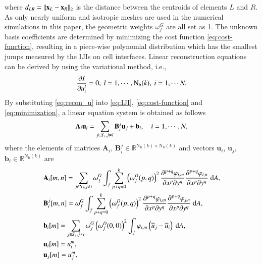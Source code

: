 where $d_{LR}= \left\| \mathbf{x}_L -\mathbf{x}_R \right\|_2$ is the distance between the centroids of elements $L$ and $R$.
As only nearly uniform and isotropic meshes are used in the numerical simulations in this paper,
the geometric weights
$\omega^G_f$ are all set as 1.
The unknown basis coefficients are determined by minimizing the cost function \eqref{eq:cost-function}, resulting in a  piece-wise polynomial distribution which has the smallest jumps measured by the IJIs on cell interfaces.
Linear reconstruction equations can be derived by using the variational method, i.e.,
\begin{equation}
    \label{eq:minimization}
    \partialderivative{I}{u_i^l} = 0, \ l=1,\cdots, \mathrm{N_b}(k),\  i=1,\cdots N.
\end{equation}
By substituting \eqref{eq:recon_u} into \eqref{eq:IJI}, \eqref{eq:cost-function} and \eqref{eq:minimization}, a linear equation system is obtained as follows
\begin{equation}
    \label{eq:vrBlockEq}
    \mathbf{A}_{i} \mathbf{u}_i
    =
    \sum_{j \in S_i, j \neq i} \mathbf{B}^j_{i} \mathbf{u}_j + \mathbf{b}_{i}, \quad i=1, \cdots, N,
\end{equation}
where the elements of matrices
$\mathbf{A}_i$, $\mathbf{B}^j_i \in \mathbb{R}^{\mathrm{N_b}(k) \times \mathrm{N_b}(k)}$
and vectors $\mathbf{u}_i$, $\mathbf{u}_j$, $\mathbf{b}_i \in \mathbb{R}^{\mathrm{N_b}(k)}$ are
\begin{equation}
    \label{eq:vrCoeffs}
    \begin{aligned}
         & \mathbf{A}_{i} [m,n]=
        \sum_{j \in S_i, j \neq i} \omega_f^G\int_{f}{
            \sum_{p+q=0}^{k}
            \left(\omega_f^D(p,q)\right)^2
            \partialderivative{^{p+q}\varphi_{i,m}}{x^p\partial y^q}
            \partialderivative{^{p+q}\varphi_{i,n}}{x^p\partial y^q}
            \ \dd A},
        \\
         & \mathbf{B}^j_{i} [m,n]=
        \omega_f^G\int_{f}{
            \sum_{p+q=0}^{k}
            \left(\omega_f^D(p,q)\right)^2
            \partialderivative{^{p+q}\varphi_{i,m}}{x^p\partial y^q}
            \partialderivative{^{p+q}\varphi_{j,n}}{x^p\partial y^q}
            \ \dd A},
        \\
         & \mathbf{b}_{i} [m]=
        \sum_{j \in S_i, j \neq i}
        \omega_f^G \left(\omega_f^D(0,0)\right)^2
        \int_{f}{
            \varphi_{i,m} \left(\overline{u}_j - \overline{u}_i\right)
            \ \dd A},
        \\
         & \mathbf{u}_i [m]= u^m_i, \\
         & \mathbf{u}_j [m]= u^m_j,
    \end{aligned}
\end{equation}
